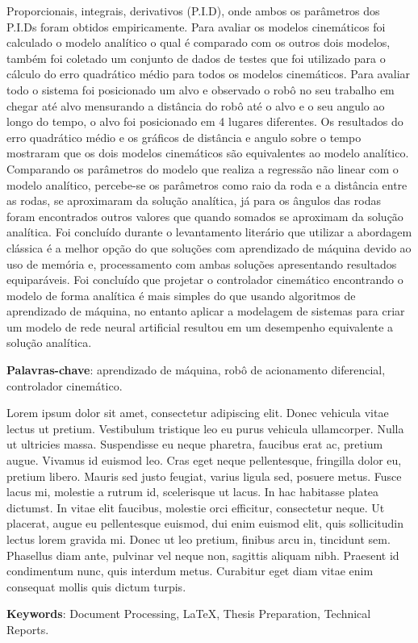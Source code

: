 Proporcionais, integrais, derivativos (P.I.D),
onde ambos os parâmetros dos P.I.Ds foram obtidos empiricamente.
Para avaliar os modelos cinemáticos foi calculado o modelo analítico o qual
é comparado com os outros dois modelos, também foi coletado um conjunto de
dados de testes que foi utilizado para o cálculo do erro quadrático
médio para todos os modelos cinemáticos.
Para avaliar todo o sistema foi posicionado um alvo e observado o robô no 
seu trabalho em chegar até alvo mensurando a distância do robô até o
alvo e o seu angulo ao longo do tempo, o alvo foi posicionado em 4 lugares
diferentes. Os resultados do erro quadrático médio e os
gráficos de distância e angulo sobre o tempo 
mostraram que os dois modelos cinemáticos são equivalentes ao modelo
analítico. Comparando os parâmetros do modelo que realiza a
regressão não linear com o modelo analítico,
percebe-se os parâmetros como raio da roda e a distância entre as rodas,
se aproximaram da solução analítica, já para os ângulos das rodas foram
encontrados outros valores que quando somados se aproximam da solução
analítica. Foi concluído durante o levantamento literário que
utilizar a abordagem clássica é a melhor opção do que soluções com
aprendizado de máquina devido ao uso de memória e,
processamento com ambas soluções apresentando resultados equiparáveis.
Foi concluído que projetar o controlador cinemático encontrando o modelo
de forma analítica é mais simples do que usando algoritmos de aprendizado
de máquina, no entanto aplicar a modelagem  de sistemas para criar um
modelo de rede neural artificial resultou em um desempenho equivalente
a solução analítica.




\vspace{1.5ex}

{\bf Palavras-chave}: aprendizado de máquina, robô de acionamento diferencial,
controlador cinemático.

%
%

Lorem ipsum dolor sit amet, consectetur adipiscing elit. Donec vehicula vitae lectus ut pretium. Vestibulum tristique leo eu purus vehicula ullamcorper. Nulla ut ultricies massa. Suspendisse eu neque pharetra, faucibus erat ac, pretium augue. Vivamus id euismod leo. Cras eget neque pellentesque, fringilla dolor eu, pretium libero. Mauris sed justo feugiat, varius ligula sed, posuere metus. Fusce lacus mi, molestie a rutrum id, scelerisque ut lacus. In hac habitasse platea dictumst. In vitae elit faucibus, molestie orci efficitur, consectetur neque. Ut placerat, augue eu pellentesque euismod, dui enim euismod elit, quis sollicitudin lectus lorem gravida mi. Donec ut leo pretium, finibus arcu in, tincidunt sem. Phasellus diam ante, pulvinar vel neque non, sagittis aliquam nibh. Praesent id condimentum nunc, quis interdum metus. Curabitur eget diam vitae enim consequat mollis quis dictum turpis.

\vspace{1.5ex}

{\bf Keywords}: Document Processing, \LaTeX, Thesis Preparation,
Technical Reports.
